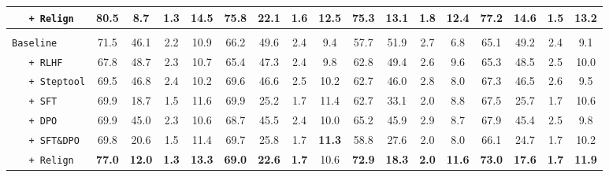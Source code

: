 \begin{table}[!ht]
\begin{adjustbox}{width=0.98\textwidth}
\begin{tabular}{lcccccccccccccccc}
        \texttt{\ \ \  +  Relign }     & \textbf{80.5} & \textbf{8.7} & \textbf{1.3} & \textbf{14.5} & \textbf{75.8} & 22.1 & \textbf{1.6} & \textbf{12.5} & \textbf{75.3} & \textbf{13.1} & \textbf{1.8} & \textbf{12.4} & \textbf{77.2} & \textbf{14.6} & \textbf{1.5} & \textbf{13.2} \\
        \midrule
        \rowcolor{gray!8}\multicolumn{17}{c}{\textit{Qwen2.5 (7B)}~\citep{yang2024qwen2}}\\
        \midrule
        \texttt{Baseline}    & 71.5 & 46.1 & 2.2 & 10.9 & 66.2 & 49.6 & 2.4 & 9.4 & 57.7 & 51.9 & 2.7 & 6.8 & 65.1 & 49.2 & 2.4 & 9.1 \\
        \texttt{\ \ \  + RLHF}  & 67.8 & 48.7 & 2.3 & 10.7 & 65.4 & 47.3 & 2.4 & 9.8 & 62.8 & 49.4 & 2.6 & 9.6 & 65.3 & 48.5 & 2.5 & 10.0  \\
        \texttt{\ \ \  + Steptool}   & 69.5 & 46.8 & 2.4 & 10.2 & 69.6 & 46.6 & 2.5 & 10.2 & 62.7 & 46.0 & 2.8 & 8.0 & 67.3 & 46.5 & 2.6 & 9.5 \\
         \hdashline
        \texttt{\ \ \  +  SFT} & 69.9 & 18.7 & 1.5 & 11.6 & 69.9 & 25.2 & 1.7 & 11.4 & 62.7 & 33.1 & 2.0 & 8.8 & 67.5 & 25.7 & 1.7 & 10.6  \\
        \texttt{\ \ \  +  DPO}  & 69.9 & 45.0 & 2.3 & 10.6 & 68.7 & 45.5 & 2.4 & 10.0 & 65.2 & 45.9 & 2.9 & 8.7 & 67.9 & 45.4 & 2.5 & 9.8   \\
        \texttt{\ \ \  +  SFT\&DPO}   & 69.8 & 20.6 & 1.5 & 11.4 & 69.7 & 25.8 & 1.7 & \textbf{11.3} & 58.8 & 27.6 & 2.0 & 8.0 & 66.1 & 24.7 & 1.7 & 10.2 \\
        \texttt{\ \ \  + Relign} & \textbf{77.0} & \textbf{12.0} & \textbf{1.3} & \textbf{13.3} & \textbf{69.0} & \textbf{22.6} & \textbf{1.7} & 10.6 & \textbf{72.9} & \textbf{18.3} & \textbf{2.0} & \textbf{11.6} & \textbf{73.0} & \textbf{17.6} & \textbf{1.7} & \textbf{11.9}  \\
        \bottomrule
    \end{tabular}%
    \end{adjustbox}
\label{table:main_res}
\end{table}